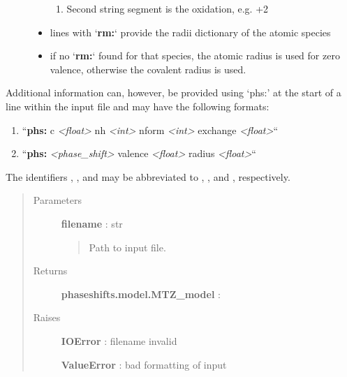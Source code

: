 \documentclass[letterpaper,10pt,english]{sphinxmanual}
\begin{document}
\begin{fulllineitems}
\begin{fulllineitems}
\begin{description}
\begin{itemize}
\begin{enumerate}
\item {} 
Second string segment is the oxidation, e.g. +2

\end{enumerate}

\item {} 
lines with `\textbf{rm:}` provide the radii dictionary of the atomic 
species

\item {} 
if no `\textbf{rm:}` found for that species, the atomic radius is used 
for zero valence, otherwise the covalent radius is used.

\end{itemize}

\end{description}

Additional information can, however, be provided using `phs:' at the 
start of a line within the input file and may have the following 
formats:
\begin{enumerate}
\item {} 
``\textbf{phs:} c \emph{\textless{}float\textgreater{}} nh \emph{\textless{}int\textgreater{}} nform \emph{\textless{}int\textgreater{}} exchange \emph{\textless{}float\textgreater{}}``

\item {} 
``\textbf{phs:} \emph{\textless{}phase\_shift\textgreater{}} valence \emph{\textless{}float\textgreater{}} radius \emph{\textless{}float\textgreater{}}``

\end{enumerate}

The identifiers , ,  and  may 
be abbreviated to , ,  and , respectively.
\begin{quote}\begin{description}
\item[{Parameters}] \leavevmode
\textbf{filename} : str
\begin{quote}

Path to input file.
\end{quote}

\item[{Returns}] \leavevmode
\textbf{phaseshifts.model.MTZ\_model} :

\item[{Raises}] \leavevmode
\textbf{IOError} : filename invalid

\textbf{ValueError} : bad formatting of input

\end{description}\end{quote}

\end{fulllineitems}


\end{fulllineitems}
\end{document}
